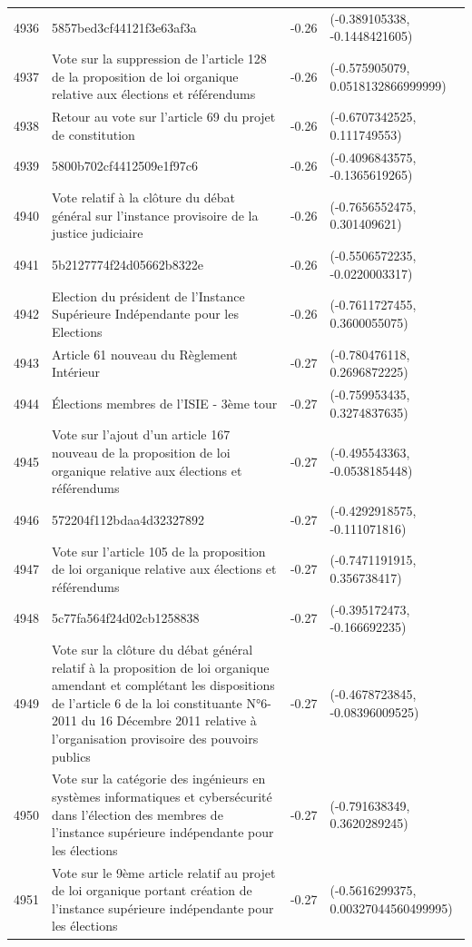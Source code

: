 \begin{table}[ht]
\begin{tabular}{rlrl}
  4936 & 5857bed3cf44121f3e63af3a & -0.26 & (-0.389105338, -0.1448421605) \\ 
  4937 & Vote sur la suppression de l'article 128 de la proposition de loi organique relative aux élections et référendums & -0.26 & (-0.575905079, 0.0518132866999999) \\ 
  4938 & Retour au vote sur l'article 69 du projet de constitution & -0.26 & (-0.6707342525, 0.111749553) \\ 
  4939 & 5800b702cf4412509e1f97c6 & -0.26 & (-0.4096843575, -0.1365619265) \\ 
  4940 & Vote relatif à la clôture du débat général sur l'instance provisoire de la justice judiciaire & -0.26 & (-0.7656552475, 0.301409621) \\ 
  4941 & 5b2127774f24d05662b8322e & -0.26 & (-0.5506572235, -0.0220003317) \\ 
  4942 & Election du président de l'Instance Supérieure Indépendante pour les Elections & -0.26 & (-0.7611727455, 0.3600055075) \\ 
  4943 & Article 61 nouveau du Règlement Intérieur & -0.27 & (-0.780476118, 0.2696872225) \\ 
  4944 & Élections membres de l'ISIE - 3ème tour & -0.27 & (-0.759953435, 0.3274837635) \\ 
  4945 & Vote sur l'ajout d'un article 167 nouveau de la proposition de loi organique relative aux élections et référendums & -0.27 & (-0.495543363, -0.0538185448) \\ 
  4946 & 572204f112bdaa4d32327892 & -0.27 & (-0.4292918575, -0.111071816) \\ 
  4947 & Vote sur l'article 105 de la proposition de loi organique relative aux élections et référendums & -0.27 & (-0.7471191915, 0.356738417) \\ 
  4948 & 5c77fa564f24d02cb1258838 & -0.27 & (-0.395172473, -0.166692235) \\ 
  4949 & Vote sur la clôture du débat général relatif à la proposition de loi organique amendant et complétant les dispositions de l'article 6 de la loi constituante N°6-2011 du 16 Décembre 2011 relative à l'organisation provisoire des pouvoirs publics & -0.27 & (-0.4678723845, -0.08396009525) \\ 
  4950 & Vote sur la catégorie des ingénieurs en systèmes informatiques et cybersécurité dans l'élection des membres de l'instance supérieure indépendante pour les élections & -0.27 & (-0.791638349, 0.3620289245) \\ 
  4951 & Vote sur le 9ème article relatif au projet de loi organique portant création de l'instance supérieure indépendante pour les élections & -0.27 & (-0.5616299375, 0.00327044560499995) \\ 

\end{tabular}
\end{table}

